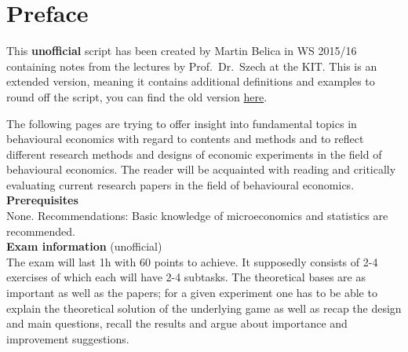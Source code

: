 

\chapter*{Preface}
This \textbf{unofficial} script has been created by Martin Belica in WS 2015/16 containing notes from the lectures by Prof.~Dr.~Szech at the KIT. This is an extended version, meaning it contains additional definitions and examples to round off the script, you can find the old version \href{http://goo.gl/EOC2Kh}{here}.

The following pages are trying to offer insight into fundamental topics in behavioural economics with regard to contents and methods and to reflect different research methods and designs of economic experiments in the field of behavioural economics. The reader will be acquainted with reading and critically evaluating current research papers in the field of behavioural economics. \\

\textbf{Prerequisites} \\
None. Recommendations: Basic knowledge of microeconomics and statistics are recommended. \\

\textbf{Exam information} (unofficial) \\
The exam will last 1h with 60 points to achieve. It supposedly consists of 2-4 exercises of which each will have 2-4 subtasks. The theoretical bases are as important as well as the papers; for a given experiment one has to be able to explain the theoretical solution of the underlying game as well as recap the design and main questions, recall the results and argue about importance and improvement suggestions.